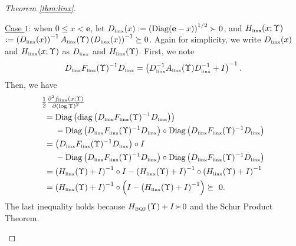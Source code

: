 \documentclass[smallextended]{svjour3hack}       %
\DeclareMathOperator{\Diag}{Diag}
\DeclareMathOperator{\diag}{diag}
\begin{document}
\begin{proof}[Theorem \ref{thm:linx}]
\begin{itemize}
    \smallskip
    \underline{Case $1$}: when $0\le x<\mathbf{e}$,  let $D_{{\tiny\mbox{linx}}}(x):=\left(\Diag(\mathbf{e}-x)\right)^{1/2} \succ 0$, and  $H_{{\tiny\mbox{linx}}}(x;\Upsilon)$ $:=\left(D_{{\tiny\mbox{linx}}}(x)\right)^{-1} A_{{\tiny\mbox{linx}}}(\Upsilon) \left(D_{{\tiny\mbox{linx}}}(x)\right)^{-1}\succeq 0$. Again for simplicity, we write $D_{{\tiny\mbox{linx}}}(x)$ and $H_{{\tiny\mbox{linx}}}(x;\Upsilon)$ as $D_{{\tiny\mbox{linx}}}$ and $H_{{\tiny\mbox{linx}}}(\Upsilon)$. First, we note
    \begin{align*}
        D_{{\tiny\mbox{linx}}}  F_{{\tiny\mbox{linx}}}(\Upsilon)^{-1}D_{{\tiny\mbox{linx}}} =\left( D_{{\tiny\mbox{linx}}}^{-1} A_{{\tiny\mbox{linx}}}(\Upsilon) D_{{\tiny\mbox{linx}}}^{-1} + I\right)^{-1}.
    \end{align*}
     Then, we have
    \begin{align*}
        & \textstyle\frac{1}{2} \frac{\partial^2 f_{{\tiny\mbox{linx}}}\left(x;\Upsilon\right)}{\partial \left(\log \Upsilon\right) ^2} \\
        &~= \Diag\left(\diag\left( D_{{\tiny\mbox{linx}}}  F_{{\tiny\mbox{linx}}}(\Upsilon)^{-1}D_{{\tiny\mbox{linx}}}\right)\right) \\
        &~~ \quad -\Diag\left( D_{{\tiny\mbox{linx}}}  F_{{\tiny\mbox{linx}}}(\Upsilon)^{-1}D_{{\tiny\mbox{linx}}}\right) \circ \Diag\left( D_{{\tiny\mbox{linx}}}  F_{{\tiny\mbox{linx}}}(\Upsilon)^{-1}D_{{\tiny\mbox{linx}}}\right)\\
        & ~=\left( D_{{\tiny\mbox{linx}}}  F_{{\tiny\mbox{linx}}}(\Upsilon)^{-1}D_{{\tiny\mbox{linx}}}\right)\circ I \\
        &~~ \quad -\Diag\left( D_{{\tiny\mbox{linx}}}  F_{{\tiny\mbox{linx}}}(\Upsilon)^{-1}D_{{\tiny\mbox{linx}}}\right) \circ \Diag\left( D_{{\tiny\mbox{linx}}}  F_{{\tiny\mbox{linx}}}(\Upsilon)^{-1}D_{{\tiny\mbox{linx}}}\right)\\
        & ~=\left(H_{{\tiny\mbox{linx}}}(\Upsilon)+I \right)^{-1}\circ I - \left(H_{{\tiny\mbox{linx}}}(\Upsilon)+I \right)^{-1} \circ \left(H_{{\tiny\mbox{linx}}}(\Upsilon)+I \right)^{-1}\\
        & ~=\left(H_{{\tiny\mbox{linx}}}(\Upsilon)+I \right)^{-1} \circ \left(I - \left(H_{{\tiny\mbox{linx}}}(\Upsilon)+I \right)^{-1} \right)
        \succeq  ~ 0.
    \end{align*}
    The last inequality holds because $H_{{\tiny\mbox{BQP}}}(\Upsilon)+I \! \succ\! 0$ and the Schur Product Theorem.


\end{itemize}
\end{proof}
\end{document}
